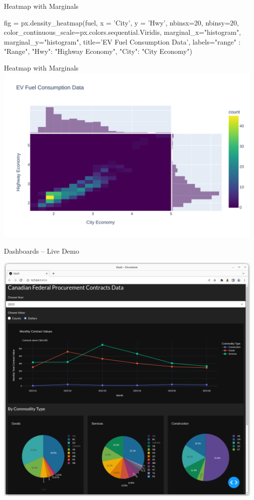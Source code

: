 \documentclass[ignorenonframetext,xcolor=x11names]{beamer}
\begin{document}
\begin{frame}[fragile]{Heatmap with Marginals}
\scriptsize
\begin{pythoncode}
fig = px.density_heatmap(fuel,
    x = 'City', y = 'Hwy',
    nbinsx=20, nbinsy=20,
    color_continuous_scale=px.colors.sequential.Viridis,
    marginal_x="histogram",
    marginal_y="histogram",
    title='EV Fuel Consumption Data',
    labels={"range" : "Range", 
           "Hwy": "Highway Economy", 
            "City": "City Economy"})
\end{pythoncode}
\end{frame}

\begin{frame}{Heatmap with Marginals}
  \includegraphics[width=\textwidth]{px.heatmap.pdf}
\end{frame}

\begin{frame}{Dashboards -- Live Demo}
\centering

  \includegraphics[width=.75\textwidth]{px.dash.screenshot.png}
\end{frame}
\end{document}
